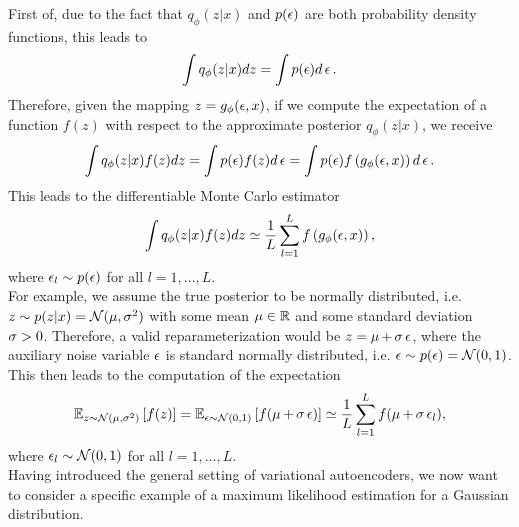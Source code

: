First of, due to the fact that $q_{\phi} (z|x)$ and $p(\operatorname{\epsilon})$ are both probability density functions, this leads to
\begin{align*}
\int q_{\phi} (z|x) dz = \int p(\operatorname{\epsilon}) d\operatorname{\epsilon}.
\end{align*}
Therefore, given the mapping $z = g_{\phi}(\operatorname{\epsilon}, x)$, if we compute the expectation of a function $f(z)$ with respect to the approximate posterior $q_{\phi}(z|x)$, we receive
\begin{align*}
\int q_{\phi}(z|x) f(z) dz = \int p(\operatorname{\epsilon}) f(z) d\operatorname{\epsilon} = \int p(\operatorname{\epsilon}) f\left(g_{\phi}(\operatorname{\epsilon}, x) \right)d\operatorname{\epsilon}.
\end{align*}
This leads to the differentiable Monte Carlo estimator
\begin{align*}
\int q_{\phi}(z|x) f(z) dz \simeq \frac{1}{L} \sum_{l=1}^L f\left(g_{\phi} (\operatorname{\epsilon}, x)\right),
\end{align*}
where $\operatorname{\epsilon}_l\sim p(\operatorname{\epsilon})$ for all $l=1,\ldots, L$.\\
For example, we assume the true posterior to be normally distributed, i.e. $z\sim p(z|x)=\mathcal{N}(\operatorname{\mu}, \operatorname{\sigma}^2)$ with some mean $\operatorname{\mu}\in\operatorname{\mathbb{R}}$ and some standard deviation $\operatorname{\sigma}>0$. Therefore, a valid reparameterization would be $z = \operatorname{\mu} +\operatorname{\sigma}\operatorname{\epsilon}$, where the auxiliary noise variable $\operatorname{\epsilon}$ is standard normally distributed, i.e. $\operatorname{\epsilon}\sim p(\operatorname{\epsilon}) = \mathcal{N}(0,1)$. This then leads to the computation of the expectation
\begin{align*}
\operatorname{\mathbb{E}}_{z\sim \mathcal{N}(\operatorname{\mu}, \operatorname{\sigma}^2)} \left[ f(z) \right] = \operatorname{\mathbb{E}}_{\operatorname{\epsilon} \sim \mathcal{N}(0, 1)} \left[ f(\operatorname{\mu} + \operatorname{\sigma}\operatorname{\epsilon}) \right] \simeq \frac{1}{L} \sum_{l=1}^L f(\operatorname{\mu} + \operatorname{\sigma}\operatorname{\epsilon}_l),
\end{align*}
where $\operatorname{\epsilon}_l\sim \mathcal{N}(0, 1)$ for all $l=1,\ldots, L$.\\
Having introduced the general setting of variational autoencoders, we now want to consider a specific example of a maximum likelihood estimation for a Gaussian distribution.
